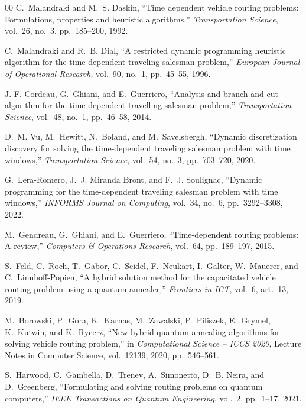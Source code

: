\documentclass[conference]{IEEEtran}
\begin{document}
\begin{thebibliography}{00}
C.~Malandraki and M.~S. Daskin,
``Time dependent vehicle routing problems: Formulations, properties and heuristic algorithms,''
\emph{Transportation Science},
vol.~26, no.~3, pp.~185--200, 1992.

C.~Malandraki and R.~B. Dial,
``A restricted dynamic programming heuristic algorithm for the time dependent traveling salesman problem,''
\emph{European Journal of Operational Research},
vol.~90, no.~1, pp.~45--55, 1996.

J.-F. Cordeau, G.~Ghiani, and E.~Guerriero,
``Analysis and branch-and-cut algorithm for the time-dependent travelling salesman problem,''
\emph{Transportation Science},
vol.~48, no.~1, pp.~46--58, 2014.

D.~M. Vu, M.~Hewitt, N.~Boland, and M.~Savelsbergh,
``Dynamic discretization discovery for solving the time-dependent traveling salesman problem with time windows,''
\emph{Transportation Science},
vol.~54, no.~3, pp.~703--720, 2020.

G.~Lera-Romero, J.~J. Miranda Bront, and F.~J. Soulignac,
``Dynamic programming for the time-dependent traveling salesman problem with time windows,''
\emph{INFORMS Journal on Computing},
vol.~34, no.~6, pp.~3292--3308, 2022.

M.~Gendreau, G.~Ghiani, and E.~Guerriero,
``Time-dependent routing problems: A review,''
\emph{Computers \& Operations Research},
vol.~64, pp.~189--197, 2015.

S.~Feld, C.~Roch, T.~Gabor, C.~Seidel, F.~Neukart, I.~Galter, W.~Mauerer, and C.~Linnhoff-Popien,
``A hybrid solution method for the capacitated vehicle routing problem using a quantum annealer,''
\emph{Frontiers in ICT},
vol.~6, art.~13, 2019.

M.~Borowski, P.~Gora, K.~Karnas, M.~Zawalski, P.~Piliszek, E.~Grymel, K.~Kutwin, and K.~Rycerz,
``New hybrid quantum annealing algorithms for solving vehicle routing problem,''
in \emph{Computational Science -- ICCS 2020},
Lecture Notes in Computer Science, vol.~12139, 2020, pp.~546--561.

S.~Harwood, C.~Gambella, D.~Trenev, A.~Simonetto, D.~B. Neira, and D.~Greenberg,
``Formulating and solving routing problems on quantum computers,''
\emph{IEEE Transactions on Quantum Engineering},
vol.~2, pp.~1--17, 2021.


\end{thebibliography}
\end{document}
